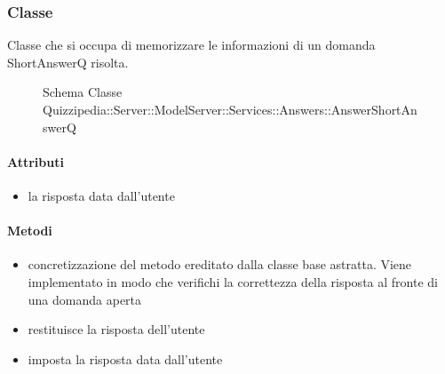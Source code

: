 \subsubsection{Classe }
Classe che si occupa di memorizzare le informazioni di un domanda ShortAnswerQ risolta.
\begin{figure}[H]
\centering
\noindent{}
\caption[Schema Classe AnswerShortAnswerQ]{Schema Classe Quizzipedia::Server::ModelServer::Services::Answers::AnswerShortAnswerQ}
\end{figure}
\paragraph{Attributi}
\begin{itemize}
\item {}
\newline
la risposta data dall'utente
\end{itemize}
\paragraph{Metodi}
\begin{itemize}
\item {}
\newline
concretizzazione del metodo ereditato dalla classe base astratta. Viene implementato in modo che verifichi la correttezza della risposta al fronte di una domanda aperta
\newline
\item {}
\newline
restituisce la risposta dell'utente
\newline
\item {}
\newline
imposta la risposta data dall'utente
\newline
\end{itemize}
